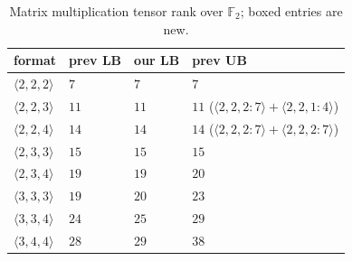\documentclass[11pt]{article}
\theoremstyle{definition}
\newcommand{\F}{\mathbb{F}}
\newcommand{\mmt}[3]{\langle #1,#2,#3\rangle}
\begin{document}
\begin{table}[!ht]
  \centering
  \setlength{\tabcolsep}{14pt}
  \begin{tabular}{llll}
    \toprule
    format          & prev LB                                                          & our LB       & prev UB                                                      \\
    \midrule
    $\mmt{2}{2}{2}$ & $7$~\cite{hopcroft1971minimizing}                                & $7$          & $7$~\cite{strassen1969gaussian}                              \\
    $\mmt{2}{2}{3}$ & $11$~\cite{hopcroft1971minimizing}                               & $11$         & $11$ ($\langle 2, 2, 2:7\rangle + \langle 2, 2, 1:4\rangle$) \\
    $\mmt{2}{2}{4}$ & $14$~\cite{hopcroft1971minimizing}                               & $14$         & $14$ ($\langle 2, 2, 2:7\rangle + \langle 2, 2, 2:7\rangle$) \\
    $\mmt{2}{3}{3}$ & $15$~\cite{hopcroft1971minimizing}                               & $15$         & $15$~\cite{hopcroft1971minimizing}                           \\
    $\mmt{2}{3}{4}$ & $19$~\cite{ja1985improved}                                       & $19$         & $20$~\cite{hopcroft1971minimizing}                           \\
    $\mmt{3}{3}{3}$ & $19$~\cite{blaser2003complexity}                                 & $\boxed{20}$ & $23$~\cite{laderman1976noncommutative}                       \\
    $\mmt{3}{3}{4}$ & $24$~\cite{blaser2003complexity}                                 & $\boxed{25}$ & $29$~\cite{smirnov2013bilinear}                              \\
    $\mmt{3}{4}{4}$ & $28$~\cite{blaser1999lower}                                      & $\boxed{29}$ & $38$~\cite{smirnov2013bilinear}                              \\
    \bottomrule
  \end{tabular}
  \caption{Matrix multiplication tensor rank over $\F_2$; boxed entries are new.}
  \label{tab:matrix}
\end{table}
\end{document}
